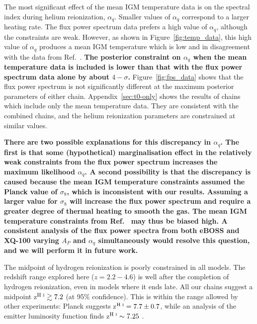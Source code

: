 The most significant effect of the mean IGM temperature data is on the spectral index during helium reionization, $\alpha_q$.
Smaller values of $\alpha_q$ correspond to a larger heating rate.
The flux power spectrum data prefers a high value of $\alpha_q$, although the constraints are weak.
However, as shown in Figure~\ref{fig:temp_data}, this high value of $\alpha_q$ produces a mean IGM temperature which is low and in disagreement with the data from Ref.~\cite{2021MNRAS.506.4389G}. \textbf{The posterior constraint on $\alpha_q$ when the mean temperature data is included is lower than that with the flux power spectrum data alone by about $4-\sigma$.}
Figure~\ref{fig:fps_data} shows that the flux power spectrum is not significantly different at the maximum posterior parameters of either chain.
Appendix~\ref{sec:t0-only} shows the results of chains which include only the mean temperature data.
They are consistent with the combined chains, and the helium reionization parameters are constrained at similar values.

\textbf{There are two possible explanations for this discrepancy in $\alpha_q$. The first is that some (hypothetical) marginalisation effect in the relatively weak constraints from the flux power spectrum increases the maximum likelihood $\alpha_q$. A second possibility is that the discrepancy is caused because the mean IGM temperature constraints assumed the Planck value of $\sigma_8$, which is inconsistent with our results. Assuming a larger value for $\sigma_8$ will increase the flux power spectrum and require a greater degree of thermal heating to smooth the gas. The mean IGM temperature constraints from Ref.~\cite{2021MNRAS.506.4389G} may thus be biased high. A consistent analysis of the flux power spectra from both eBOSS and XQ-100 varying $A_P$ and $\alpha_q$ simultaneously would resolve this question, and we will perform it in future work.}

The midpoint of hydrogen reionization is poorly constrained in all models.
The redshift range explored here ($z=2.2-4.6$) is well after the completion of hydrogen reionization, even in models where it ends late.
All our chains suggest a midpoint z$^{\text{H~{\sc i}}} \gtrsim 7.2$ (at 95\% confidence).
This is within the range allowed by other experiments: Planck suggests z$^{\text{H~{\sc i}}} = 7.7 \pm 0.7$, while an analysis of the \Lya emitter luminosity function finds z$^{\text{H~{\sc i}}} \sim 7.25$ \cite{2021ApJ...919..120M}.

